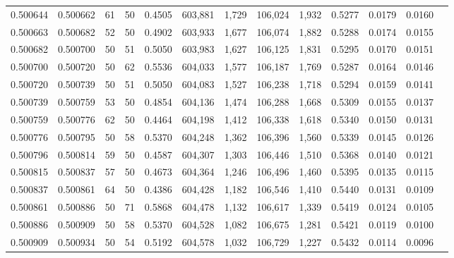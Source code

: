 \begin{tabular}{rrrrrrrrrrrrr}
0.500644 & 0.500662 &    61 &  50 &                                     0.4505 & 603,881 &   1,729 & 106,024 &   1,932 & 0.5277 & 0.0179 & 0.0160 \\
0.500663 & 0.500682 &    52 &  50 &                                     0.4902 & 603,933 &   1,677 & 106,074 &   1,882 & 0.5288 & 0.0174 & 0.0155 \\
0.500682 & 0.500700 &    50 &  51 &                                     0.5050 & 603,983 &   1,627 & 106,125 &   1,831 & 0.5295 & 0.0170 & 0.0151 \\
0.500700 & 0.500720 &    50 &  62 &                                     0.5536 & 604,033 &   1,577 & 106,187 &   1,769 & 0.5287 & 0.0164 & 0.0146 \\
0.500720 & 0.500739 &    50 &  51 &                                     0.5050 & 604,083 &   1,527 & 106,238 &   1,718 & 0.5294 & 0.0159 & 0.0141 \\
0.500739 & 0.500759 &    53 &  50 &                                     0.4854 & 604,136 &   1,474 & 106,288 &   1,668 & 0.5309 & 0.0155 & 0.0137 \\
0.500759 & 0.500776 &    62 &  50 &                                     0.4464 & 604,198 &   1,412 & 106,338 &   1,618 & 0.5340 & 0.0150 & 0.0131 \\
0.500776 & 0.500795 &    50 &  58 &                                     0.5370 & 604,248 &   1,362 & 106,396 &   1,560 & 0.5339 & 0.0145 & 0.0126 \\
0.500796 & 0.500814 &    59 &  50 &                                     0.4587 & 604,307 &   1,303 & 106,446 &   1,510 & 0.5368 & 0.0140 & 0.0121 \\
0.500815 & 0.500837 &    57 &  50 &                                     0.4673 & 604,364 &   1,246 & 106,496 &   1,460 & 0.5395 & 0.0135 & 0.0115 \\
0.500837 & 0.500861 &    64 &  50 &                                     0.4386 & 604,428 &   1,182 & 106,546 &   1,410 & 0.5440 & 0.0131 & 0.0109 \\
0.500861 & 0.500886 &    50 &  71 &                                     0.5868 & 604,478 &   1,132 & 106,617 &   1,339 & 0.5419 & 0.0124 & 0.0105 \\
0.500886 & 0.500909 &    50 &  58 &                                     0.5370 & 604,528 &   1,082 & 106,675 &   1,281 & 0.5421 & 0.0119 & 0.0100 \\
0.500909 & 0.500934 &    50 &  54 &                                     0.5192 & 604,578 &   1,032 & 106,729 &   1,227 & 0.5432 & 0.0114 & 0.0096 \\

\end{tabular}
